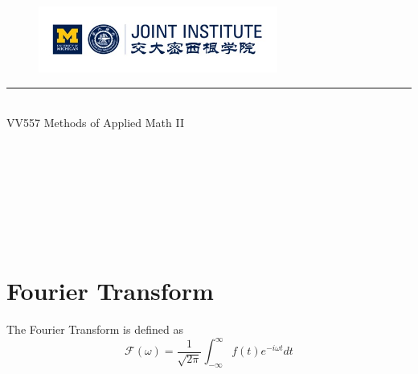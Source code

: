\documentclass{article}
\begin{document}
\setmainfont{Cormorant Upright}
\renewcommand\arraystretch{1.5}


\thispagestyle{empty}

\begin{center}
\begin{large}
\begin{figure}[!htbp]
\centering
\includegraphics[width=0.7\textwidth]{Logo2}
\end{figure}
\hrule
\vspace*{0.25cm}
 \\
\Large  VV557 Methods of Applied Math II\\
\end{large}
\hrulefill

\vspace*{2cm}
\begin{Large}
 \\
\end{Large}
\vspace*{2cm}
\begin{Large}
\\
\end{Large}
\vspace*{0.5cm}
\begin{large}
 \\
 \\
 \\
\end{large}
\end{center}
\newpage
\setmainfont{Optima}
\setmonofont{Optima}
\setsansfont{Optima}
\setcounter{page}{1}
\normalsize
\section{Fourier Transform}
The Fourier Transform is defined as 
\[
	\mathcal{F}(\omega)=\frac{1}{\sqrt{2\pi}} \int_{-\infty}^{\infty} f(t) e^{-i \omega t} d t
\]
\end{document}
